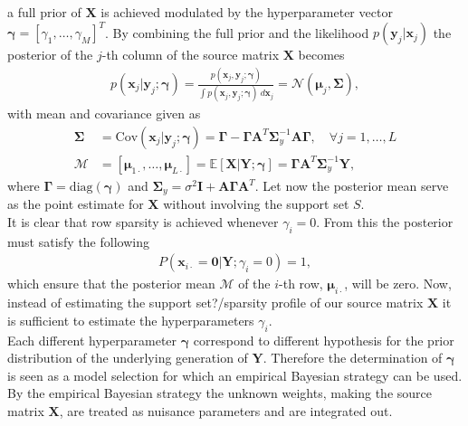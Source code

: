 a full prior of $\mathbf{X}$ is achieved modulated by the hyperparameter vector $\boldsymbol{\gamma} = [\gamma_1, \dots, \gamma_M]^T$. By combining the full prior and the likelihood $p(\mathbf{y}_{j} \vert \mathbf{x}_{j})$ the posterior of the $j$-th column of the source matrix $\mathbf{X}$ becomes
\begin{align*}
p(\mathbf{x}_{j} \vert \mathbf{y}_{j} ; \boldsymbol{\gamma}) = \frac{p(\mathbf{x}_{j}, \mathbf{y}_{j} ; \boldsymbol{\gamma})}{\int p(\mathbf{x}_{j}, \mathbf{y}_{j} ; \boldsymbol{\gamma}) \ d \mathbf{x}_{j}} = \mathcal{N}(\boldsymbol{\mu}_{j}, \boldsymbol{\Sigma}),
\end{align*}
with mean and covariance given as
\begin{align}
\boldsymbol{\Sigma} &= \text{Cov}(\mathbf{x}_{j} \vert \mathbf{y}_{j} ; \boldsymbol{\gamma}) = \boldsymbol{\Gamma} - \boldsymbol{\Gamma} \mathbf{A}^T \boldsymbol{\Sigma}_y^{-1} \mathbf{A} \boldsymbol{\Gamma}, \quad \forall j = 1, \dots, L \nonumber \\
\mathcal{M} &= [\boldsymbol{\mu}_{1 \cdot}, \dots, \boldsymbol{\mu}_{ L \cdot}] = \mathbb{E}[\mathbf{X} \vert \mathbf{Y} ; \boldsymbol{\gamma}] = \boldsymbol{\Gamma} \mathbf{A}^T \boldsymbol{\Sigma}_y^{-1} \mathbf{Y}, \label{eq:moments}
\end{align}
where $\boldsymbol{\Gamma} = \text{diag}(\boldsymbol{\gamma})$ and $\boldsymbol{\Sigma}_y = \sigma^2 \mathbf{I} + \mathbf{A} \boldsymbol{\Gamma} \mathbf{A}^T$. Let now the posterior mean serve as the point estimate for $\mathbf{X}$ without involving the support set $S$.
\\
It is clear that row sparsity is achieved whenever $\gamma_i = 0$. From this the posterior must satisfy the following 
\begin{align*}
P(\mathbf{x}_{i \cdot} = \mathbf{0} \vert \mathbf{Y} ; \gamma_i = 0) = 1,
\end{align*}
which ensure that the posterior mean $\mathcal{M}$ of the $i$-th row, $\boldsymbol{\mu}_{i \cdot}$, will be zero. Now, instead of estimating the support set?/sparsity profile of our source matrix $\mathbf{X}$ it is sufficient to estimate the hyperparameters $\gamma_i$\cite[p. 147]{phd_wipf}.
\\
Each different hyperparameter $\boldsymbol{\gamma}$ correspond to different hypothesis for the prior distribution of the underlying generation of $\mathbf{Y}$. Therefore the determination of $\boldsymbol{\gamma}$ is seen as a model selection for which an empirical Bayesian strategy can be used. By the empirical Bayesian strategy the unknown weights, making the source matrix $\textbf{X}$, are treated as nuisance parameters and are integrated out.
